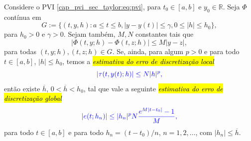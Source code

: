 \begin{teo}\label{cap_pvi_sec_taylor:teo:conv}
  Considere o PVI \eqref{cap_pvi_sec_taylor:eq:pvi}, para $t_0\in [a, b]$ e $y_0\in\mathbb{R}$. Seja $\Phi$ contínua em
  \begin{equation}
    G := \{(t, y, h): a\leq t\leq b, |y-y(t)|\leq\gamma, 0\leq|h|\leq h_0\},
  \end{equation}
  para $h_0>0$ e $\gamma>0$. Sejam também, $M, N$ constantes tais que
  \begin{equation}
    \left|\Phi(t, y; h) - \Phi(t, z; h)\right| \leq M|y - z|,
  \end{equation}
  para todas $(t, y; h), (t, z; h)\in G$. Se, ainda, para algum $p>0$ e para todo $t\in [a, b]$, $|h|\leq h_0$, temos a \hl{\emph{estimativa do erro de discretização local}}
  \begin{equation}\label{cap_pvi_sec_taylor:eq:est_erro_local}\color{blue}\left|\tau(t, y(t); h)\right| \leq N |h|^p,
  \end{equation}
  então existe $\overline{h}$, $0<\overline{h}<h_0$, tal que vale a seguinte \hl{\emph{estimativa do erro de discretização global}}
  \begin{equation}\label{cap_pvi_sec_taylor:eq:est_erro_global}\color{blue}|e(t; h_n)| \leq |h_n|^pN\frac{e^{M|t-t_0|}-1}{M},
  \end{equation}
  para todo $t\in [a, b]$ e para todo $h_n = (t-t_0)/n$, $n=1, 2, \ldots$, com $|h_n|\leq \overline{h}$.
\end{teo}
